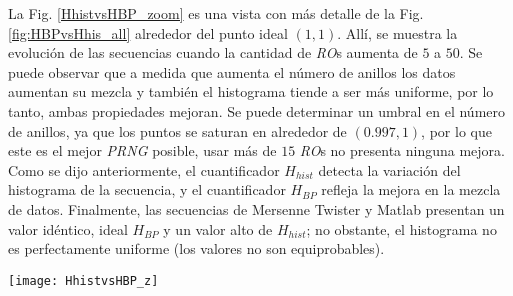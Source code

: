 La Fig. \ref{HhistvsHBP_zoom} es una vista con más detalle de la Fig. \ref{fig:HBPvsHhis_all} alrededor del punto ideal $(1,1)$.
Allí, se muestra la evolución de las secuencias cuando la cantidad de \emph{RO}s aumenta de $5$ a $50$.
Se puede observar que a medida que aumenta el número de anillos los datos aumentan su mezcla y también el histograma tiende a ser más uniforme, por lo tanto, ambas propiedades mejoran.
Se puede determinar un umbral en el número de anillos, ya que los puntos se saturan en alrededor de $(0.997,1)$, por lo que este es el mejor \emph{PRNG} posible, usar más de $15$ \emph{RO}s no presenta ninguna mejora.
Como se dijo anteriormente, el cuantificador $H_ {hist}$ detecta la variación del histograma de la secuencia, y el cuantificador $ H_ {BP} $ refleja la mejora en la mezcla de datos.
Finalmente, las secuencias de Mersenne Twister y Matlab presentan un valor idéntico, ideal $H_ {BP}$ y un valor alto de $H_ {hist}$; no obstante, el histograma no es perfectamente uniforme (los valores no son equiprobables).
%
\begin{figure*}
	\begin{center}
		\texttt{[image: HhistvsHBP\_z]}
		\caption{Detalle de la Fig. \ref{fig:HBPvsHhis_all} alrededor del punto ideal $(1,1)$.}
		\label{HhistvsHBP_zoom}
	\end{center}
\end{figure*}
